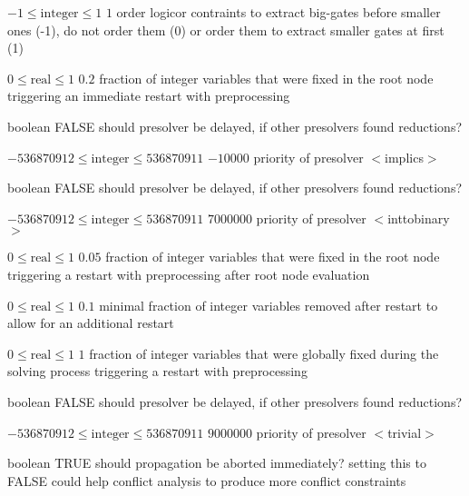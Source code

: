 %
{$-1\leq\textrm{integer}\leq1$}%
{$1$}%
{order logicor contraints to extract big-gates before smaller ones (-1), do not order them (0) or order them to extract smaller gates at first (1)}%
{}

%
{$0\leq\textrm{real}\leq1$}%
{$0.2$}%
{fraction of integer variables that were fixed in the root node triggering an immediate restart with preprocessing}%
{}

%
{boolean}%
{FALSE}%
{should presolver be delayed, if other presolvers found reductions?}%
{}

%
{$-536870912\leq\textrm{integer}\leq536870911$}%
{$-10000$}%
{priority of presolver $<$implics$>$}%
{}

%
{boolean}%
{FALSE}%
{should presolver be delayed, if other presolvers found reductions?}%
{}

%
{$-536870912\leq\textrm{integer}\leq536870911$}%
{$7000000$}%
{priority of presolver $<$inttobinary$>$}%
{}

%
{$0\leq\textrm{real}\leq1$}%
{$0.05$}%
{fraction of integer variables that were fixed in the root node triggering a restart with preprocessing after root node evaluation}%
{}

%
{$0\leq\textrm{real}\leq1$}%
{$0.1$}%
{minimal fraction of integer variables removed after restart to allow for an additional restart}%
{}

%
{$0\leq\textrm{real}\leq1$}%
{$1$}%
{fraction of integer variables that were globally fixed during the solving process triggering a restart with preprocessing}%
{}

%
{boolean}%
{FALSE}%
{should presolver be delayed, if other presolvers found reductions?}%
{}

%
{$-536870912\leq\textrm{integer}\leq536870911$}%
{$9000000$}%
{priority of presolver $<$trivial$>$}%
{}

%
{boolean}%
{TRUE}%
{should propagation be aborted immediately? setting this to FALSE could help conflict analysis to produce more conflict constraints}%
{}

